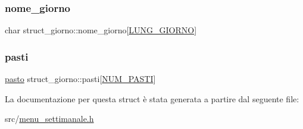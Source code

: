 \subsubsection{\texorpdfstring{nome\+\_\+giorno}{nome\_giorno}}
{\footnotesize\ttfamily char struct\+\_\+giorno\+::nome\+\_\+giorno\mbox{[}\hyperlink{menu__settimanale_8h_a89f2bc47bf642f29f85eb025d9b096c1}{L\+U\+N\+G\+\_\+\+G\+I\+O\+R\+NO}\mbox{]}}

\mbox{\label{structstruct__giorno_a89202927f5dc2d5ba6ca5d58431bdff5}} 
\subsubsection{\texorpdfstring{pasti}{pasti}}
{\footnotesize\ttfamily \hyperlink{menu__settimanale_8h_a9bcb2afe3bf63e9bf406a2d1e7fa8644}{pasto} struct\+\_\+giorno\+::pasti\mbox{[}\hyperlink{menu__settimanale_8h_a2000ebf33ae486fb0f53926d79ae1c7f}{N\+U\+M\+\_\+\+P\+A\+S\+TI}\mbox{]}}



La documentazione per questa struct è stata generata a partire dal seguente file\+:\begin{DoxyCompactItemize}
\item 
src/\hyperlink{menu__settimanale_8h}{menu\+\_\+settimanale.\+h}\end{DoxyCompactItemize}

